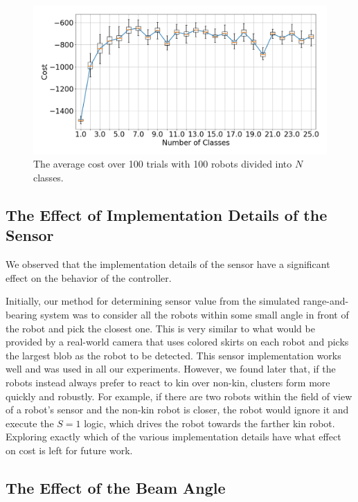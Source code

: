 \documentclass[letterpaper, 10 pt, conference]{ieeeconf}
\begin{document}
\begin{figure}[t]
  \centering
  \includegraphics[width=1\linewidth]{./images/num_classes_vs_cost_100_robots}
  \caption{The average cost over 100 trials with 100 robots divided into $N$ classes.}
  \label{fig:num_classes_100}
\end{figure}

\subsection{The Effect of Implementation Details of the Sensor} \label{section:sensor_impl}

We observed that the implementation details of the sensor have a significant
effect on the behavior of the controller.

Initially, our method for determining sensor value from the simulated
range-and-bearing system was to consider all the robots within some small angle
in front of the robot and pick the closest one. This is very similar to what
would be provided by a real-world camera that uses colored skirts on each robot
and picks the largest blob as the robot to be detected. This sensor
implementation works well and was used in all our experiments. However,
we found later that, if the robots instead always prefer to react to kin over
non-kin, clusters form more quickly and robustly. For example, if there are
two robots within the field of view of a robot's sensor and the non-kin robot is
closer, the robot would ignore it and execute the $S=1$ logic, which drives the
robot towards the farther kin robot. Exploring exactly which of the various
implementation details have what effect on cost is left for future work.

\subsection{The Effect of the Beam Angle} \label{sec:aperture_angle}
\end{document}
